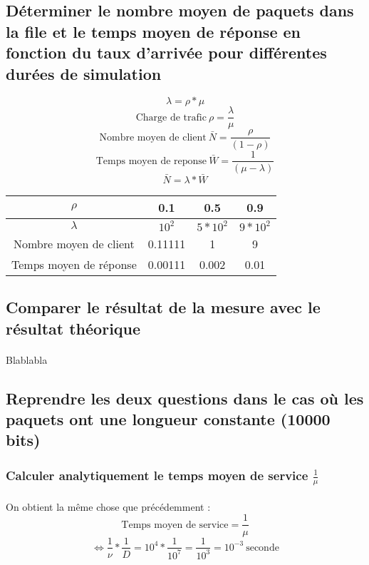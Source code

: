         \subsection{Déterminer le nombre moyen de paquets dans la file et le temps moyen de réponse en fonction du taux d'arrivée pour différentes durées de simulation}
\[  \lambda = \rho * \mu \]
\[  \text{Charge de trafic} \ \rho = \frac{\lambda}{\mu} \]
\[  \text{Nombre moyen de client} \ \bar{N} = \frac{\rho}{(1 - \rho)} \]
\[  \text{Temps moyen de reponse} \ \bar{W} = \frac{1}{(\mu - \lambda)} \]
\[  \bar{N} = \lambda * \bar{W} \]
\begin{center}
    \begin{tabular}{ | c | c| c | c | }
        \hline
            $\rho$ & 0.1 & 0.5 & 0.9 \\
        \hline
            $\lambda$ & $10^{2}$ & $5*10^{2}$ & $9*10^{2}$ \\
        \hline
            Nombre moyen de client & 0.11111 & 1 & 9 \\
        \hline
            Temps moyen de réponse & 0.00111 & 0.002 & 0.01 \\
        \hline
    \end{tabular}
\end{center}
%
        \subsection{Comparer le résultat de la mesure avec le résultat théorique}
            \paragraph{}
Blablabla
%
        \subsection{Reprendre les deux questions dans le cas où les paquets ont une longueur constante (10000 bits)}
%
            \subsubsection{Calculer analytiquement le temps moyen de service $\frac{1}{\mu}$}
%
                \paragraph{}
On obtient la même chose que précédemment :
\[  \text{Temps moyen de service} = \frac{1}{\mu} \]
\[ \iff \frac{1}{\nu} * \frac{1}{D} = 10^{4} * \frac{1}{10^{7}} = \frac{1}{10^{3}} = 10^{-3} \ \text{seconde} \]
%
